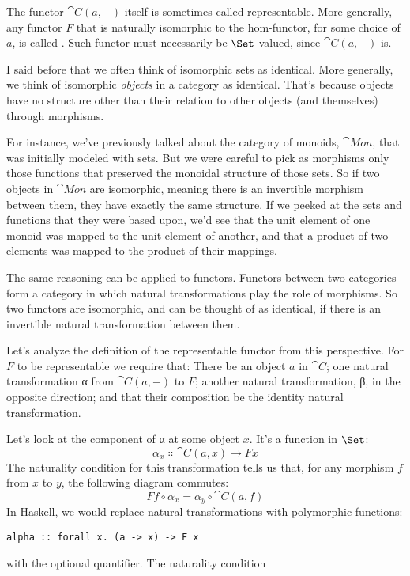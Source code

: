 The functor $\cat{C}(a, -)$ itself is sometimes called representable.
More generally, any functor $F$ that is naturally isomorphic to
the hom-functor, for some choice of $a$, is called
. Such functor must necessarily be
$\Set$-valued, since $\cat{C}(a, -)$ is.

I said before that we often think of isomorphic sets as identical. More
generally, we think of isomorphic \emph{objects} in a category as
identical. That's because objects have no structure other than their
relation to other objects (and themselves) through morphisms.

For instance, we've previously talked about the category of monoids,
$\cat{Mon}$, that was initially modeled with sets. But we were careful
to pick as morphisms only those functions that preserved the monoidal
structure of those sets. So if two objects in $\cat{Mon}$ are
isomorphic, meaning there is an invertible morphism between them, they
have exactly the same structure. If we peeked at the sets and functions
that they were based upon, we'd see that the unit element of one monoid
was mapped to the unit element of another, and that a product of two
elements was mapped to the product of their mappings.

The same reasoning can be applied to functors. Functors between two
categories form a category in which natural transformations play the
role of morphisms. So two functors are isomorphic, and can be thought of
as identical, if there is an invertible natural transformation between
them.

Let's analyze the definition of the representable functor from this
perspective. For $F$ to be representable we require that: There
be an object $a$ in $\cat{C}$; one natural transformation α from
$\cat{C}(a, -)$ to $F$; another natural transformation, β, in
the opposite direction; and that their composition be the identity
natural transformation.

Let's look at the component of α at some object $x$. It's a
function in $\Set$:
\[\alpha_x \Colon \cat{C}(a, x) \to F x\]
The naturality condition for this transformation tells us that, for any
morphism $f$ from $x$ to $y$, the following diagram
commutes:
\[F f \circ \alpha_x = \alpha_y \circ \cat{C}(a, f)\]
In Haskell, we would replace natural transformations with polymorphic
functions:

\begin{Verbatim}
alpha :: forall x. (a -> x) -> F x
\end{Verbatim}
with the optional  quantifier. The naturality condition

